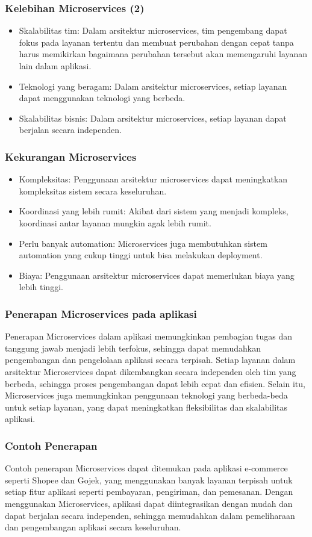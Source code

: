 \documentclass[aspectratio=169, table]{beamer}
\begin{document}
	\begin{frame}
		\frametitle{Kelebihan Microservices (2)}

		\begin{itemize}

			\item Skalabilitas tim: Dalam arsitektur microservices, tim pengembang dapat fokus pada layanan tertentu dan membuat perubahan dengan cepat tanpa harus memikirkan bagaimana perubahan tersebut akan memengaruhi layanan lain dalam aplikasi.
			\item Teknologi yang beragam: Dalam arsitektur microservices, setiap layanan dapat menggunakan teknologi yang berbeda.
			\item Skalabilitas bisnis: Dalam arsitektur microservices, setiap layanan dapat berjalan secara independen.
		\end{itemize}
	\end{frame}

	\begin{frame}
		\frametitle{Kekurangan Microservices}
		\begin{itemize}
			\item Kompleksitas: Penggunaan arsitektur microservices dapat meningkatkan kompleksitas sistem secara keseluruhan.
			\item Koordinasi yang lebih rumit: Akibat dari sistem yang menjadi kompleks, koordinasi antar layanan mungkin agak lebih rumit.
			\item Perlu banyak automation: Microservices juga membutuhkan sistem automation yang cukup tinggi untuk bisa melakukan deployment.
			\item Biaya: Penggunaan arsitektur microservices dapat memerlukan biaya yang lebih tinggi.
		\end{itemize}
	\end{frame}

	\begin{frame}
		\frametitle{Penerapan Microservices pada aplikasi}
		Penerapan Microservices dalam aplikasi memungkinkan pembagian tugas dan tanggung jawab menjadi lebih terfokus, sehingga dapat memudahkan pengembangan dan pengelolaan aplikasi secara terpisah. Setiap layanan dalam arsitektur Microservices dapat dikembangkan secara independen oleh tim yang berbeda, sehingga proses pengembangan dapat lebih cepat dan efisien. Selain itu, Microservices juga memungkinkan penggunaan teknologi yang berbeda-beda untuk setiap layanan, yang dapat meningkatkan fleksibilitas dan skalabilitas aplikasi.
	\end{frame}

	\begin{frame}
		\frametitle{Contoh Penerapan}
		Contoh penerapan Microservices dapat ditemukan pada aplikasi e-commerce seperti Shopee dan Gojek, yang menggunakan banyak layanan terpisah untuk setiap fitur aplikasi seperti pembayaran, pengiriman, dan pemesanan. Dengan menggunakan Microservices, aplikasi dapat diintegrasikan dengan mudah dan dapat berjalan secara independen, sehingga memudahkan dalam pemeliharaan dan pengembangan aplikasi secara keseluruhan.
	\end{frame}
\end{document}
